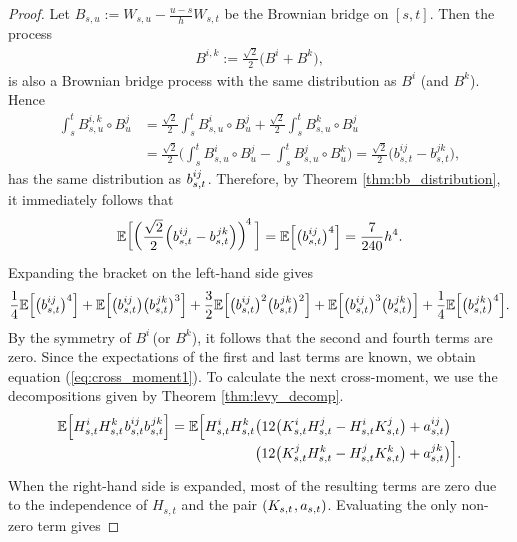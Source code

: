 \documentclass[sn-mathphys-num]{sn-jnl}%
\newcommand{\E}{\mathbb{E}}
\newcommand{\m}{\hspace{0.25mm}}
\begin{document}
\begin{proof}
Let $B_{s,u} := W_{s,u} - \frac{u-s}{h}W_{s,t}$ be the Brownian bridge on $[s,t]$. Then the process
\begin{align}\label{eq:bridge_ik}
B^{i,k} := \frac{\sqrt{2}}{2}\big(B^i + B^k\big),
\end{align}
is also a Brownian bridge process with the same distribution as $B^i$ (and $B^k$). Hence
\begin{align*}
\int_s^t B_{s,u}^{i,k} \circ B_u^j & = \frac{\sqrt{2}}{2}\int_s^t B_{s,u}^i \circ B_u^j + \frac{\sqrt{2}}{2}\int_s^t B_{s,u}^k \circ B_u^j\\
& = \frac{\sqrt{2}}{2}\bigg(\int_s^t B_{s,u}^i \circ B_u^j - \int_s^t B_{s,u}^j \circ B_u^k\bigg) = \frac{\sqrt{2}}{2}\big(b_{s,t}^{ij} - b_{s,t}^{jk}\big),
\end{align*}
has the same distribution as $b_{s,t}^{ij}\m$. Therefore, by Theorem \ref{thm:bb_distribution}, it immediately follows that
\begin{align*}
\E\bigg[\bigg(\frac{\sqrt{2}}{2}\Big(b_{s,t}^{ij} - b_{s,t}^{\m jk}\Big)\bigg)^{\hspace{-0.25mm}4}\,\bigg] = \E\Big[\big(b_{s,t}^{ij}\big)^4\Big] = \frac{7}{240}h^4.
\end{align*}
Expanding the bracket on the left-hand side gives
\begin{align*}
\frac{1}{4}\E\Big[\big(b_{s,t}^{ij}\big)^4\Big] + \E\Big[\big(b_{s,t}^{ij}\big)\big(b_{s,t}^{\m jk}\big)^3\Big] + \frac{3}{2}\E\Big[\big(b_{s,t}^{ij}\big)^2\big(b_{s,t}^{\m jk}\big)^2\Big] + \E\Big[\big(b_{s,t}^{ij}\big)^3\big(b_{s,t}^{\m jk}\big)\Big] + \frac{1}{4}\E\Big[\big(b_{s,t}^{\m jk}\big)^4\Big]. 
\end{align*}
By the symmetry of $B^i\,$(or $B^k$), it follows that the second and fourth terms are zero.
Since the expectations of the first and last terms are known, we obtain equation (\ref{eq:cross_moment1}). To calculate the next cross-moment, we use the decompositions given by Theorem \ref{thm:levy_decomp}.
\begin{align*}
\E\Big[H_{s,t}^i H_{s,t}^k\m b_{s,t}^{ij}b_{s,t}^{\m jk}\Big] & = \E\Big[H_{s,t}^i H_{s,t}^k \big( 12\big(K_{s,t}^i H_{s,t}^j - H_{s,t}^i K_{s,t}^j\big) + a_{s,t}^{ij}\big)\\[-3pt]
&\hspace{21.3mm} \big(12\big(K_{s,t}^j H_{s,t}^k - H_{s,t}^j K_{s,t}^k\big) + a_{s,t}^{jk}\big)\Big].
\end{align*}
When the right-hand side is expanded, most of the resulting terms are zero due to the independence of $H_{s,t}$ and the pair $(K_{s,t}\m, a_{s,t})$. Evaluating the only non-zero term gives

\end{proof}
\end{document}
